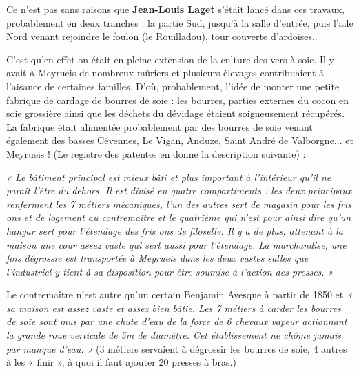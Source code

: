 \vspace{0.55cm}

Ce n’est pas sans raisons que \textbf{Jean-Louis Laget} s’était lancé dans ces travaux,
probablement en deux tranches : la partie Sud, jusqu’à la salle d’entrée, puis l’aile
Nord venant rejoindre le foulon (le Rouilladou), tour couverte d’ardoises..

\vspace{0.35cm}

C’est qu’en effet on était en pleine extension de la culture des vers à soie. Il y avait à
Meyrueis de nombreux mûriers et plusieurs élevages contribuaient à l’aisance de
certaines familles. D’où, probablement, l’idée de monter une petite fabrique de
cardage de bourres de soie : les bourres, parties externes du cocon en soie grossière
ainsi que les déchets du dévidage étaient soigneusement récupérés. La fabrique était
alimentée probablement par des bourres de soie venant également des basses
Cévennes, Le Vigan, Anduze, Saint André de Valborgne... et Meyrueis ! (Le registre
des patentes en donne la description suivante) :

\vspace{0.25cm}

\begin{flushleft}
\hspace{0.35cm}
\parbox{0.88\textwidth}{
\textit{
« Le bâtiment principal est mieux bâti et plus important à l’intérieur qu’il ne
paraît l’être du dehors. Il est divisé en quatre compartiments : les deux
principaux renferment les 7 métiers mécaniques, l’un des autres sert de magasin
pour les fris ons et de logement au contremaître et le quatrième qui n’est pour
ainsi dire qu’un hangar sert pour l’étendage des fris ons de filoselle.
Il y a de plus, attenant à la maison une cour assez vaste qui sert aussi pour
l’étendage.
La marchandise, une fois dégrossie est transportée à Meyrueis dans les deux
vastes salles que l’industriel y tient à sa disposition pour être soumise à l’action
des presses. »
}
}
\end{flushleft}

\vspace{0.25cm}

Le contremaître n’est autre qu’un certain Benjamin Avesque à partir de 1850 et
\textit{« sa maison est assez vaste et assez bien bâtie. Les 7 métiers à carder les bourres de soie sont
mus par une chute d’eau de la force de 6 chevaux vapeur actionnant la grande roue
verticale de 5m de diamètre. Cet établissement ne chôme jamais par manque d’eau. »}
(3 métiers servaient à dégrossir les bourres de soie, 4 autres à les « finir », à quoi il faut
ajouter 20 presses à bras.)

